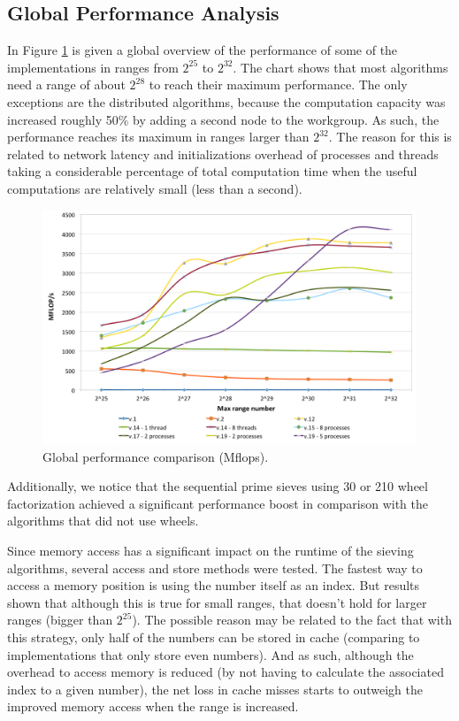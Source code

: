 \documentclass[runningheads,a4paper]{llncs}
\begin{document}
\subsection{Global Performance Analysis}
\label{Global Performance Analysis}

In Figure \ref{fig:global_perf_comparison} is given a global overview of the performance of some of the implementations in ranges from $2^{25}$ to $2^{32}$. The chart shows that most algorithms need a range of about $2^{28}$ to reach their maximum performance. The only exceptions are the distributed algorithms, because the computation capacity was increased roughly 50\% by adding a second node to the workgroup. As such, the performance reaches its maximum in ranges larger than $2^{32}$. The reason for this is related to network latency and initializations overhead of processes and threads taking a considerable percentage of total computation time when the useful computations are relatively small (less than a second).

\begin{figure}[h]
        \centering
        \includegraphics[height=7.0cm]{images/global_perf_comparison}
        \caption{Global performance comparison (Mflops).}
        \label{fig:global_perf_comparison}
\end{figure}

Additionally, we notice that the sequential prime sieves using 30 or 210 wheel factorization achieved a significant performance boost in comparison with the algorithms that did not use wheels.

Since memory access has a significant impact on the runtime of the sieving algorithms, several access and store methods were tested. The fastest way to access a memory position is using the number itself as an index. But results shown that although this is true for small ranges, that doesn't hold for larger ranges (bigger than $2^{25}$). The possible reason may be related to the fact that with this strategy, only half of the numbers can be stored in cache (comparing to implementations that only store even numbers). And as such, although the overhead to access memory is reduced (by not having to calculate the associated index to a given number), the net loss in cache misses starts to outweigh the improved memory access when the range is increased.
\end{document}
